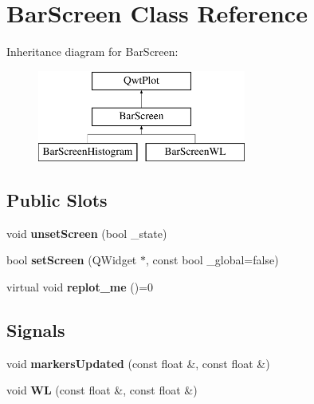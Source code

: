 \hypertarget{classBarScreen}{}\section{Bar\+Screen Class Reference}
\label{classBarScreen}
Inheritance diagram for Bar\+Screen\+:\begin{figure}[H]
\begin{center}
\leavevmode
\includegraphics[height=3.000000cm]{classBarScreen}
\end{center}
\end{figure}
\subsection*{Public Slots}
\begin{DoxyCompactItemize}
\item 
\mbox{\label{classBarScreen_a73d64473bee2dceb5e14f6ecd9085c5a}} 
void {\bfseries unset\+Screen} (bool \+\_\+state)
\item 
\mbox{\label{classBarScreen_a584ecbf24a178b74fee22eb40e6281de}} 
bool {\bfseries set\+Screen} (Q\+Widget $\ast$, const bool \+\_\+global=false)
\item 
\mbox{\label{classBarScreen_a5ced2edf8912f341afaa2fda187be861}} 
virtual void {\bfseries replot\+\_\+me} ()=0
\end{DoxyCompactItemize}
\subsection*{Signals}
\begin{DoxyCompactItemize}
\item 
\mbox{\label{classBarScreen_a39dadd115d8012630aac2ff7cb188fa6}} 
void {\bfseries markers\+Updated} (const float \&, const float \&)
\item 
\mbox{\label{classBarScreen_a3251fb8903f71f8ea0df00d17b7302cf}} 
void {\bfseries WL} (const float \&, const float \&)
\end{DoxyCompactItemize}
